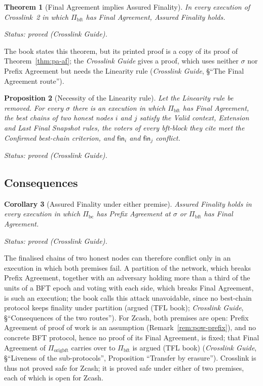 \documentclass[11pt,a4paper]{article}
\newtheorem{theorem}{Theorem}[section]
\newtheorem{proposition}[theorem]{Proposition}
\newtheorem{corollary}[theorem]{Corollary}
\theoremstyle{definition}
\newcommand{\bc}{\mathrm{bc}}
\newcommand{\bft}{\mathrm{bft}}
\newcommand{\Piorigbft}{\Pi_{\mathrm{origbft}}}
\newcommand{\Pibc}{\Pi_{\bc}}
\newcommand{\Pibft}{\Pi_{\bft}}
\newcommand{\fin}{\mathsf{fin}}
\begin{document}
\begin{theorem}[Final Agreement implies Assured Finality]\label{thm:fa-af}
In every execution of Crosslink~2 in which $\Pibft$ has Final Agreement,
Assured Finality holds.

Status: proved (Crosslink Guide).
\end{theorem}

The book states this theorem, but its printed proof is a copy of its proof
of Theorem~\ref{thm:pa-af}; the \emph{Crosslink Guide} gives a proof, which
uses neither $\sigma$ nor Prefix Agreement but needs the Linearity rule
(\emph{Crosslink Guide}, \S``The Final Agreement route'').

\begin{proposition}[Necessity of the Linearity rule]\label{prop:fa-needs-lin}
Let the Linearity rule be removed. For every $\sigma$ there is an execution
in which $\Pibft$ has Final Agreement, the best chains of two honest nodes
$i$ and $j$ satisfy the Valid context, Extension and Last Final Snapshot
rules, the voters of every bft-block they cite meet the Confirmed best-chain
criterion, and $\fin_i$ and $\fin_j$ conflict.

Status: proved (Crosslink Guide).
\end{proposition}

\subsection{Consequences}\label{sec:safety-either}

\begin{corollary}[Assured Finality under either premise]\label{cor:af-either}
Assured Finality holds in every execution in which $\Pibc$ has Prefix
Agreement at $\sigma$ or $\Pibft$ has Final Agreement.

Status: proved (Crosslink Guide).
\end{corollary}

The finalised chains of two honest nodes can therefore conflict only in an
execution in which both premises fail. A partition of the network, which
breaks Prefix Agreement, together with an adversary holding more than a
third of the units of a BFT epoch and voting with each side, which breaks
Final Agreement, is such an execution; the book calls this attack
unavoidable, since no best-chain protocol keeps finality under partition
(argued (TFL book); \emph{Crosslink Guide}, \S``Consequences of the two
routes''). For Zcash, both premises are open: Prefix Agreement of proof of
work is an assumption (Remark~\ref{rem:pow-prefix}), and no concrete BFT
protocol, hence no proof of its Final Agreement, is fixed; that Final
Agreement of $\Piorigbft$ carries over to $\Pibft$ is argued (TFL book)
(\emph{Crosslink Guide}, \S``Liveness of the sub-protocols'', Proposition
``Transfer by erasure''). Crosslink is thus
not proved safe for Zcash; it is proved safe under either of two premises,
each of which is open for Zcash.
\end{document}
